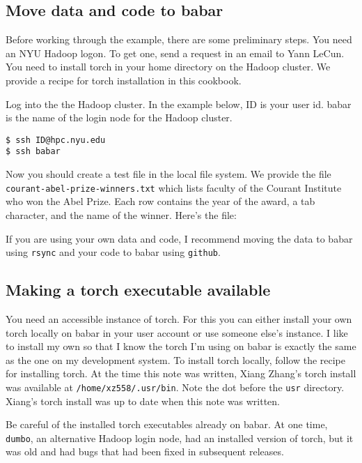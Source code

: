 \documentclass{article}
\let\code\texttt %
\begin{document}
\subsection{Move data and code to babar}

Before working through the example, there are some preliminary steps.
You need an NYU Hadoop logon. To get one, send a request in an email to
Yann LeCun. You need to install torch in your home directory 
on the Hadoop cluster. We provide a recipe for torch
installation in this cookbook.

Log into the the Hadoop cluster. In the example below, ID is your user
id. babar is the name of the login node for the Hadoop cluster.

\begin{verbatim}
$ ssh ID@hpc.nyu.edu
$ ssh babar 
\end{verbatim}


Now you should create a test file in the local file system. We provide
the file \code{courant-abel-prize-winners.txt} which lists faculty of the
Courant Institute who won the Abel Prize. Each row contains the year of
the award, a tab character, and the name of the winner. Here's the file:



If you are using your own data and code, I recommend moving the data to
babar using \code{rsync} and your code to babar using \code{github}.

\subsection{Making a torch executable available}

You need an accessible instance of torch. For this you can either
install your own torch locally on babar in your user account or use
someone else's instance. I like to install my own so that I know the
torch I'm using on babar is exactly the same as the one on my
development system. To install torch locally, follow the recipe for
installing torch. At the time this note was written, Xiang
Zhang's torch install was available at \code{/home/xz558/.usr/bin}. Note
the dot before the \code{usr} directory. Xiang's torch install was up to
date when this note was written.

Be careful of the installed torch executables already on babar. At one time,
\code{dumbo}, an alternative Hadoop login node, had an installed version
of torch, but it was old and had bugs that had been fixed in subsequent
releases.
\end{document}
